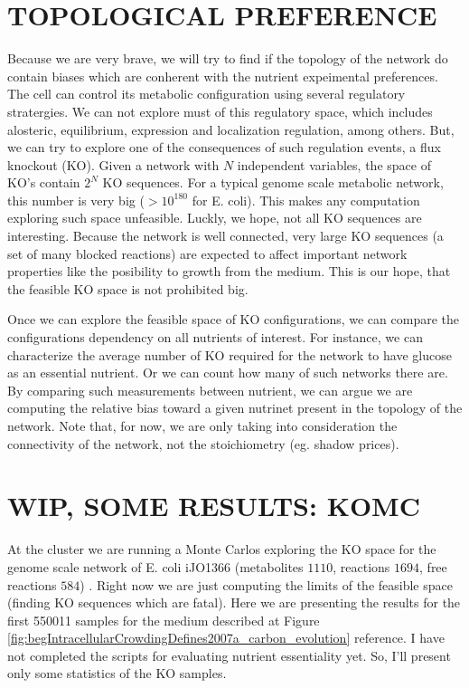 \documentclass[
10pt, %
a4paper, %
oneside, %
headinclude,footinclude, %
BCOR5mm, %
]{scrartcl}
\begin{document}
\section{TOPOLOGICAL PREFERENCE}

Because we are very brave, we will try to find if the topology of the network do contain biases which are conherent with the nutrient expeimental preferences. 
The cell can control its metabolic configuration using several regulatory stratergies. We can not explore must of this regulatory space, which includes alosteric, equilibrium, expression and localization regulation, among others. 
But, we can try to explore one of the consequences of such regulation events, a flux knockout (KO).
Given a network with $N$ independent variables, the space of KO's contain $2^N$ KO sequences.
For a typical genome scale metabolic network, this number is very big ($> 10^{180}$ for E. coli).
This makes any computation exploring such space unfeasible. 
Luckly, we hope, not all KO sequences are interesting. 
Because the network is well connected, very large KO sequences (a set of many blocked reactions) are expected to affect important network properties like the posibility to growth from the medium. 
This is our hope, that the feasible KO space is not prohibited big.

Once we can explore the feasible space of KO configurations, we can compare the configurations dependency on all nutrients of interest.
For instance, we can characterize the average number of KO required for the network to have glucose as an essential nutrient.
Or we can count how many of such networks there are. 
By comparing such measurements between nutrient, we can argue we are computing the relative bias toward a given nutrinet present in the topology of the network.
Note that, for now, we are only taking into consideration the connectivity of the network, not the stoichiometry (eg. shadow prices). 

\section{WIP, SOME RESULTS: KOMC}

At the cluster we are running a Monte Carlos exploring the KO space for the genome scale network of E. coli iJO1366 (metabolites $1110$, reactions $1694$, free reactions $584$) \cite{orthComprehensiveGenomescaleReconstruction2011}.
Right now we are just computing the limits of the feasible space (finding KO sequences which are fatal).
Here we are presenting the results for the first 550011 samples for the medium described at Figure \ref{fig:begIntracellularCrowdingDefines2007a_carbon_evolution} reference. 
I have not completed the scripts for evaluating nutrient essentiality yet. So, I'll present only some statistics of the KO samples. 
\end{document}
